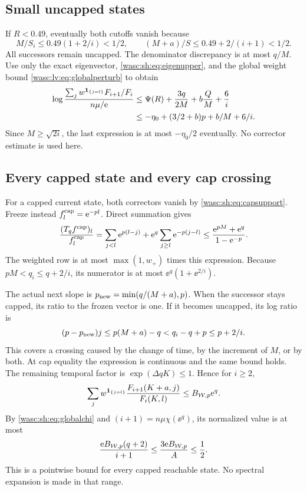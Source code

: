 \documentclass[11pt,a4paper]{article}
\theoremstyle{remark}\newtheorem{remark}[theorem]{Remark}
\newcommand{\ind}{\mathbf 1}\newcommand{\wasc}{\operatorname{wasc}}\newcommand{\dasc}{\operatorname{dasc}}
\numberwithin{equation}{section}
\begin{document}
\subsection{Small uncapped states}
If $R<0.49$, eventually both cutoffs vanish because
\[
M/S_i\le0.49(1+2/i)<1/2,\qquad (M+a)/S\le0.49+2/(i+1)<1/2.
\]
All successors remain uncapped. The denominator discrepancy is at most $q/M$. Use only the exact eigenvector, \eqref{wasc:sh:eq:eigenupper}, and the global weight bound \eqref{wasc:lv:eq:globalperturb} to obtain
\begin{align}\label{wasc:sh:eq:smalluncapped}
\log\frac{\sum_jw^{\ind_{\{j=l\}}}F_{i+1}/F_i}{n\mu/\ee}
&\le\Psi(R)+\frac{3q}{2M}+b\frac QM+\frac6i\notag\\
&\le-\eta_0+(3/2+b)p+b/M+6/i.
\end{align}
Since $M\ge\sqrt{2i}$, the last expression is at most $-\eta_0/2$ eventually. No corrector estimate is used here.

\subsection{Every capped state and every cap crossing}
For a capped current state, both correctors vanish by \eqref{wasc:sh:eq:capsupport}. Freeze instead $f_l^{\rm cap}=\mathrm e^{-pl}$. Direct summation gives
\[
\frac{(T_qf^{\rm cap})_l}{f_l^{\rm cap}}
=\sum_{j<l}\mathrm e^{p(l-j)}+\mathrm e^q\sum_{j\ge l}\mathrm e^{-p(j-l)}
\le\frac{\mathrm e^{pM}+\mathrm e^q}{1-\mathrm e^{-p}}.
\]
The weighted row is at most $\max(1,w_+)$ times this expression. Because $pM<q_i\le q+2/i$, its numerator is at most $\ee^q(1+\ee^{2/i})$.

The actual next slope is $p_{\rm new}=\min(q/(M+a),p)$. When the successor stays capped, its ratio to the frozen vector is one. If it becomes uncapped, its log ratio is
\begin{equation}\label{wasc:sh:eq:capcross}
(p-p_{\rm new})j\le p(M+a)-q<q_i-q+p\le p+2/i.
\end{equation}
This covers a crossing caused by the change of time, by the increment of $M$, or by both. At cap equality the expression is continuous and the same bound holds. The remaining temporal factor is $\exp(\Delta qK)\le1$. Hence for $i\ge2$,
\begin{equation}\label{wasc:sh:eq:caprow}
\sum_jw^{\ind_{\{j=l\}}}\frac{F_{i+1}(K+a,j)}{F_i(K,l)}
\le B_{\Wc,p}\ee^q.
\end{equation}
By \eqref{wasc:sh:eq:globalchi} and $(i+1)=n\mu\chi(\ee^q)$, its normalized value is at most
\[
\frac{\mathrm e B_{\mathcal W,p}(q+2)}{i+1}\le\frac{3\mathrm e B_{\mathcal W,p}}A\le\frac12.
\]
This is a pointwise bound for every capped reachable state. No spectral expansion is made in that range.
\end{document}
